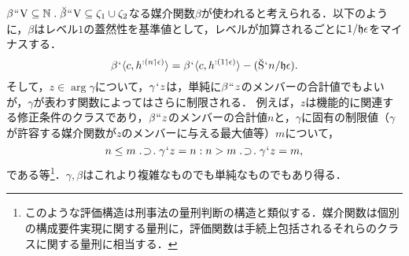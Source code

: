 $\beta\img\univ\subseteq\mathbb{N}\con{1}\breve{\beta}\img\univ\subseteq\zeta_1\cup\zeta_2$なる媒介関数$\beta$が使われると考えられる．以下のように，$\beta$はレベル$1$の蓋然性を基準値として，レベルが加算されるごとに$ 1/\mathfrak{h}\epsilon $をマイナスする．
\[
    \beta{\mspace{1mu}{`}\mspace{1mu}}\langle c,h^{:(n\mathbin{\upharpoonleft}\epsilon)} \rangle = \beta{\mspace{1mu}{`}\mspace{1mu}}\langle c,h^{:(1\mathbin{\upharpoonleft}\epsilon)} \rangle - (\breve{\mathrm{S}}{\mspace{1mu}{`}\mspace{1mu}} n/\mathfrak{h}\epsilon).
\]
そして，$z\in\arg\gamma$について，$\gamma{\mspace{1mu}{`}\mspace{1mu}} z$は，単純に$\beta{\mspace{1mu}{``}\mspace{1mu}} z$のメンバーの合計値でもよいが，$\gamma$が表わす関数によってはさらに制限される．
例えば，$z$は機能的に関連する修正条件のクラスであり，$\beta{\mspace{1mu}{``}\mspace{1mu}} z$のメンバーの合計値$n$と，$\gamma$に固有の制限値（$\gamma$が許容する媒介関数が$z$のメンバーに与える最大値等）$m$について，
\[
   n\leq m\case{1}{1}{1}\gamma\fap z = n\con{2}n > m\case{1}{1}{1}\gamma\fap z = m,
\]
である等\footnote{このような評価構造は刑事法の量刑判断の構造と類似する．媒介関数は個別の構成要件実現に関する量刑に，評価関数は手続上包括されるそれらのクラスに関する量刑に相当する．}．$\gamma,\beta$はこれより複雑なものでも単純なものでもあり得る．

